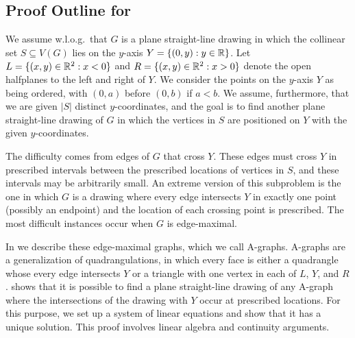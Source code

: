 \subsection{Proof Outline for }

We assume w.l.o.g.\ that $G$ is a plane straight-line
drawing in which the collinear set $S\subseteq V(G)$ lies
on the $y$-axis $Y=\{(0,y):y\in\mathbb{R}\}$. Let
$L=\{(x,y)\in\mathbb{R}^2:x<0\}$ and $R=\{(x,y)\in\mathbb{R}^2: x >0\}$ denote the open
halfplanes to the left and right of $Y$.
We consider the points on the $y$-axis $Y$ as being ordered,
with $(0,a)$ before $(0,b)$ if $a<b$. 
We
assume, furthermore, that we are given $|S|$ distinct $y$-coordinates,
and the goal is to find another plane straight-line drawing of $G$ in
which the vertices in $S$ are positioned on $Y$ with the given $y$-coordinates.



The difficulty comes from edges of $G$ that cross $Y$.
These edges must cross $Y$ in prescribed
intervals between the prescribed locations of vertices in $S$, and
these intervals may be arbitrarily small.  An extreme version of this
subproblem is the one in which $G$ is a drawing where every
edge intersects $Y$ in exactly one point (possibly an endpoint) and
the location of each crossing point is prescribed.  The most difficult
instances occur when $G$ is edge-maximal.

In  we describe these edge-maximal graphs, which
we call A-graphs.  A-graphs are a generalization of quadrangulations, in
which every face is either a quadrangle whose every edge intersects $Y$ or a triangle with one vertex in
each of $L$, $Y$, and $R$.   %
shows that it
is possible to find a plane straight-line drawing of any A-graph where
the intersections of the drawing with $Y$ occur at prescribed locations.
For this purpose, we set up a system of linear equations and show that
it has a unique solution. This proof involves linear algebra and
 continuity arguments.

